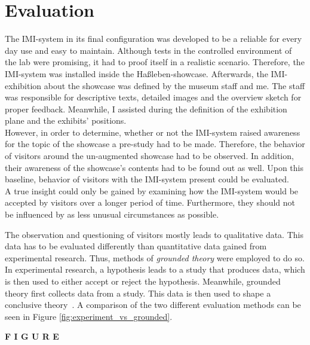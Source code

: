 \chapter{Evaluation}
\label{evaluation}

The \ac{IMI}-system in its final configuration was developed to be a reliable for every day use and easy to maintain. Although tests in the controlled environment of the lab were promising, it had to proof itself in a realistic scenario. Therefore, the \ac{IMI}-system was installed inside the Haßleben-showcase. Afterwards, the \ac{IMI}-exhibition about the showcase was defined by the museum staff and me. The staff was responsible for descriptive texts, detailed images and the overview sketch for proper feedback. Meanwhile, I assisted during the definition of the exhibition plane and the exhibits' positions.
\\
However, in order to determine, whether or not the \ac{IMI}-system raised awareness for the topic of the showcase a pre-study had to be made. Therefore, the behavior of visitors around the un-augmented showcase had to be observed. In addition, their awareness of the showcase's contents had to be found out as well. Upon this baseline, behavior of visitors with the \ac{IMI}-system present could be evaluated.
\\
A true insight could only be gained by examining how the \ac{IMI}-system would be accepted by visitors over a longer period of time. Furthermore, they should not be influenced by as less unusual circumstances as possible.

The observation and questioning of visitors mostly leads to qualitative data. This data has to be evaluated differently than quantitative data gained from experimental research. Thus, methods of \textit{grounded theory} were employed to do so. In experimental research, a hypothesis leads to a study that produces data, which is then used to either accept or reject the hypothesis. Meanwhile, grounded theory first collects data from a study. This data is then used to shape a conclusive theory~\cite{GroundedTheory}. A comparison of the two different evaluation methods can be seen in Figure \ref{fig:experiment_vs_grounded}.

\textbf{F I G U R E}
 
